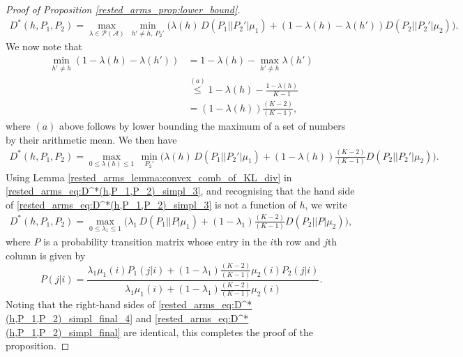 \begin{proof}[Proof of Proposition \ref{rested_arms_prop:lower_bound}]
 \begingroup\allowdisplaybreaks\begin{align}
 		D^*(h,P_1,P_2)
 		=\max\limits_{\lambda\in\mathcal{P}(\mathcal{A})}\,\min\limits_{h'\neq h,\,P_2'}\bigg(\lambda(h)\,D(P_1||P_2'|\mu_1)
 		+(1-\lambda(h)-\lambda(h'))D(P_2||P_2'|\mu_2)\bigg).\label{rested_arms_eq:D^*(h,P_1,P_2)_simpl_2}
 \end{align}\endgroup
 We now note that
 \begingroup\allowdisplaybreaks\begin{align}
 	\min\limits_{h'\neq h}(1-\lambda(h)-\lambda(h'))&=1-\lambda(h)-\max\limits_{h'\neq h}\lambda(h')\nonumber\\
 	&\stackrel{(a)}{\leq} 1-\lambda(h)-\frac{1-\lambda(h)}{K-1}\nonumber\\
 	&=(1-\lambda(h))\frac{\left(K-2\right)}{(K-1)},\label{rested_arms_eq:min_over_h'_simplified}
 \end{align}\endgroup
 where $(a)$ above follows by lower bounding the maximum of a set of numbers by their arithmetic mean. We then have
 \begingroup\allowdisplaybreaks\begin{align}
 		D^*(h,P_1,P_2)
 		=\max\limits_{0\leq\lambda(h)\leq 1}\,\min\limits_{P_2'}\bigg(\lambda(h)\,D(P_1||P_2'|\mu_1)
 		+(1-\lambda(h))\frac{(K-2)}{(K-1)}D(P_2||P_2'|\mu_2)\bigg).\label{rested_arms_eq:D^*(h,P_1,P_2)_simpl_3}
 \end{align}\endgroup
 Using Lemma \ref{rested_arms_lemma:convex_comb_of_KL_div} in \eqref{rested_arms_eq:D^*(h,P_1,P_2)_simpl_3}, and recognising that the hand side of \eqref{rested_arms_eq:D^*(h,P_1,P_2)_simpl_3} is not a function of $h$, we write
 \begingroup\allowdisplaybreaks\begin{align}
 		D^*(h,P_1,P_2)
 		=\max\limits_{0\leq\lambda_1\leq 1}\bigg(\lambda_1\,D(P_1||P|\mu_1)+(1-\lambda_1)\frac{(K-2)}{(K-1)}D(P_2||P|\mu_2)\bigg),\label{rested_arms_eq:D^*(h,P_1,P_2)_simpl_final_4}
 \end{align}\endgroup
 where $P$ is a probability transition matrix whose entry in the $i$th row and $j$th column is given by
 \begin{equation}
 	P(j|i)=\frac{\lambda_1\mu_1(i)P_1(j|i)+(1-\lambda_1)\frac{(K-2)}{(K-1)}\mu_2(i)P_2(j|i)}{\lambda_1\mu_1(i)+(1-\lambda_1)\frac{(K-2)}{(K-1)}\mu_2(i)}.\label{rested_arms_eq:P_matrix_entries}
 \end{equation}
Noting that the right-hand sides of \eqref{rested_arms_eq:D^*(h,P_1,P_2)_simpl_final_4} and \eqref{rested_arms_eq:D^*(h,P_1,P_2)_simpl_final} are identical, this completes the proof of the proposition.
\end{proof}

